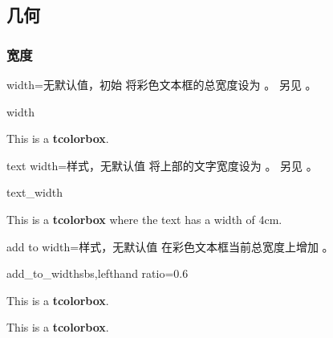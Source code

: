\clearpage
\subsection{几何}
\subsubsection{宽度}

\begin{docTcbKey}{width}{=}{无默认值，初始 }
  将彩色文本框的总宽度设为 。
  另见 。
\begin{exdispExample}{width}

\begin{tcolorbox}[width=\linewidth/2]
This is a \textbf{tcolorbox}.
\end{tcolorbox}
\end{exdispExample}
\end{docTcbKey}


\begin{docTcbKey}[][doc new=2014-10-31]{text width}{=}{样式，无默认值}
  将上部的文字宽度设为 。
  另见 。
\begin{exdispExample}{text_width}

\begin{tcolorbox}[text width=4cm]
This is a \textbf{tcolorbox} where the text has a width of 4cm.
\end{tcolorbox}
\end{exdispExample}
\end{docTcbKey}

\begin{docTcbKey}[][doc new=2014-11-07]{add to width}{=}{样式，无默认值}
  在彩色文本框当前总宽度上增加 。
\begin{exdispExample*}{add_to_width}{sbs,lefthand ratio=0.6}

\begin{tcolorbox}
This is a \textbf{tcolorbox}.
\end{tcolorbox}

\begin{tcolorbox}[add to width=1cm]
This is a \textbf{tcolorbox}.
\end{tcolorbox}
\end{exdispExample*}
\end{docTcbKey}

